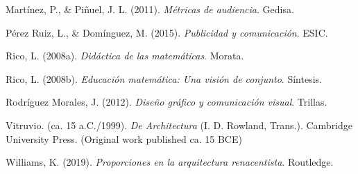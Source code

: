 \documentclass[
  stu,
  floatsintext,
  longtable,
  a4paper,
  nolmodern,
  notxfonts,
  notimes,
  colorlinks=true,linkcolor=blue,citecolor=blue,urlcolor=blue]{apa7}
\begin{document}
Martínez, P., \& Piñuel, J. L. (2011). \emph{Métricas de audiencia}.
Gedisa.

Pérez Ruiz, L., \& Domínguez, M. (2015). \emph{Publicidad y
comunicación}. ESIC.

Rico, L. (2008a). \emph{Didáctica de las matemáticas}. Morata.

Rico, L. (2008b). \emph{Educación matemática: Una visión de conjunto}.
Síntesis.

Rodríguez Morales, J. (2012). \emph{Diseño gráfico y comunicación
visual}. Trillas.

Vitruvio. (ca. 15 a.C./1999). \emph{De Architectura} (I. D. Rowland,
Trans.). Cambridge University Press. (Original work published ca. 15
BCE)

Williams, K. (2019). \emph{Proporciones en la arquitectura
renacentista}. Routledge.
\end{document}
